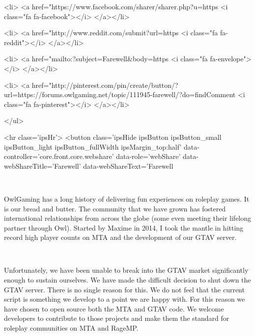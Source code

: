 			<li>
<a href="https://www.facebook.com/sharer/sharer.php?u=https%
	<i class="fa fa-facebook"></i>
</a></li>
		
			<li>
<a href="http://www.reddit.com/submit?url=https%
	<i class="fa fa-reddit"></i>
</a></li>
		
			<li>
<a href="mailto:?subject=Farewell&body=https%
	<i class="fa fa-envelope"></i>
</a></li>
		
			<li>
<a href="http://pinterest.com/pin/create/button/?url=https://forums.owlgaming.net/topic/111945-farewell/?do=findComment%
	<i class="fa fa-pinterest"></i>
</a></li>
		
	</ul>


	<hr class='ipsHr'>
	<button class='ipsHide ipsButton ipsButton_small ipsButton_light ipsButton_fullWidth ipsMargin_top:half' data-controller='core.front.core.webshare' data-role='webShare' data-webShareTitle='Farewell' data-webShareText='Farewell
	 



	 
 


	OwlGaming has a long history of delivering fun experiences on roleplay games. It is our bread and butter. The community that we have grown has fostered international relationships from across the globe (some even meeting their lifelong partner through Owl). Started by Maxime in 2014, I took the mantle in hitting record high player counts on MTA and the development of our GTAV server.
 


	 
 


	Unfortunately, we have been unable to break into the GTAV market significantly enough to sustain ourselves. We have made the difficult decision to shut down the GTAV server. There is no single reason for this. We do not feel that the current script is something we develop to a point we are happy with. For this reason we have chosen to open source both the MTA and GTAV code. We welcome developers to contribute to those projects and make them the standard for roleplay communities on MTA and RageMP.
 


